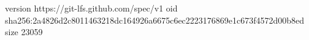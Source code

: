 version https://git-lfs.github.com/spec/v1
oid sha256:2a4826d2c8011463218dc164926a6675c6ec2223176869e1c673f4572d00b8ed
size 23059
